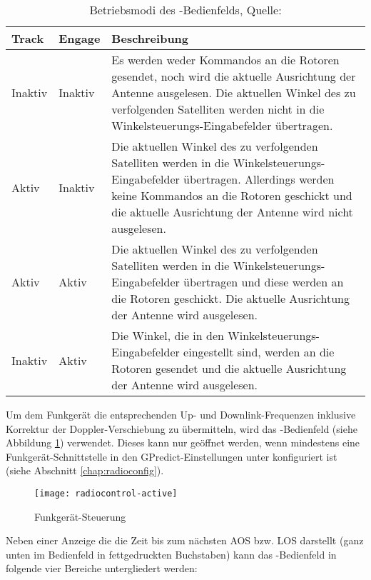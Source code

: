 \begin{table}[h]
	\caption{Betriebsmodi des -Bedienfelds, Quelle: \cite{gpredictmanual} \vspace{-2em}}	
	\begin{tabularx}{\textwidth}{|l|l|X|}
		\hline
		\textbf{Track} 	    & \textbf{Engage}	&\textbf{Beschreibung}\\
		\hline
		Inaktiv          	& Inaktiv 			& Es werden weder Kommandos an die Rotoren gesendet, noch wird die aktuelle Ausrichtung der Antenne ausgelesen. Die aktuellen Winkel des zu verfolgenden Satelliten werden nicht in die Winkelsteuerungs-Eingabefelder übertragen.\\
		Aktiv              	& Inaktiv   		& Die aktuellen Winkel des zu verfolgenden Satelliten werden in die Winkelsteuerungs-Eingabefelder übertragen. Allerdings werden keine Kommandos an die Rotoren geschickt und die aktuelle Ausrichtung der Antenne wird nicht ausgelesen.\\
		Aktiv              	& Aktiv	            & Die aktuellen Winkel des zu verfolgenden Satelliten werden in die Winkelsteuerungs-Eingabefelder übertragen und diese werden an die Rotoren geschickt. Die aktuelle Ausrichtung der Antenne wird ausgelesen.\\
		Inaktiv            	& Aktiv   			& Die Winkel, die in den Winkelsteuerungs-Eingabefelder eingestellt sind, werden an die Rotoren gesendet und die aktuelle Ausrichtung der Antenne wird ausgelesen.\\
		\hline		
	\end{tabularx}
	\label{tab:rotatorcontrolmodes}
\end{table}

\newpage

Um dem Funkgerät die entsprechenden Up- und Downlink-Frequenzen inklusive Korrektur der Doppler-Verschiebung zu übermitteln, wird das -Bedienfeld (siehe Abbildung \ref{fig:radiocontrol}) verwendet. Dieses kann nur geöffnet werden, wenn mindestens eine Funkgerät-Schnittstelle in den GPredict-Einstellungen unter  konfiguriert ist (siehe Abschnitt \ref{chap:radioconfig}).

\begin{figure}[h]
	\centering
	\texttt{[image: radiocontrol-active]}
	\caption{Funkgerät-Steuerung}
	\label{fig:radiocontrol} 
\end{figure}

Neben einer Anzeige die die Zeit bis zum nächsten \ac{AOS} bzw. \ac{LOS} darstellt (ganz unten im Bedienfeld in fettgedruckten Buchstaben) kann das -Bedienfeld in folgende vier Bereiche untergliedert werden:

